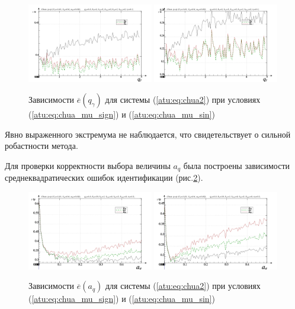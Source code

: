 \begin{figure}[htb!]
\centerline{
  \includegraphics[width=0.49\textwidth]{p/cha/chua/chua_m5p-p_qg_e_sign.png}
  \includegraphics[width=0.49\textwidth]{p/cha/chua/chua_m5p-p_qg_e_sin.png}
}
  \caption{Зависимости  $\overline{e}(q_\gamma)$ для системы (\ref{atu:eq:chua2})
  при условиях (\ref{atu:eq:chua_mu_sign}) и (\ref{atu:eq:chua_mu_sin})
}
\label{atu:f:chua_e_qgamma}
\end{figure}

Явно выраженного экстремума не наблюдается, что свидетельствует
о сильной робастности метода.

Для проверки корректности выбора величины $a_q$ была построены зависимости
среднеквадратических ошибок идентификации (рис.\ref{atu:f:chua_e_a_q}).


\begin{figure}[htb!]
\centerline{
  \includegraphics[width=0.49\textwidth]{p/cha/chua/chua_m5p-p_a_q_e_sign.png}
  \includegraphics[width=0.49\textwidth]{p/cha/chua/chua_m5p-p_a_q_e_sin.png}
}
  \caption{Зависимости  $\overline{e}(a_q)$ для системы (\ref{atu:eq:chua2})
  при условиях (\ref{atu:eq:chua_mu_sign}) и (\ref{atu:eq:chua_mu_sin})
}
\label{atu:f:chua_e_a_q}
\end{figure}

